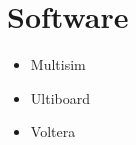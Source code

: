 \section{Software}
\begin{itemize}
        \item Multisim
        \item Ultiboard
        \item Voltera
\end{itemize}
